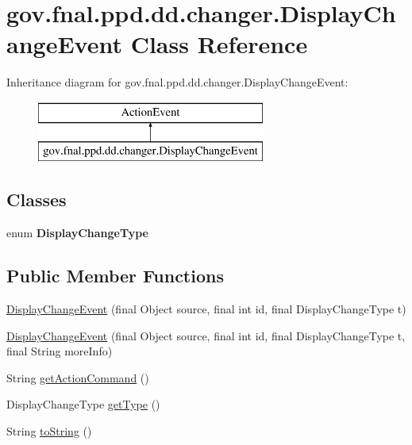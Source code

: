 \hypertarget{classgov_1_1fnal_1_1ppd_1_1dd_1_1changer_1_1DisplayChangeEvent}{\section{gov.\-fnal.\-ppd.\-dd.\-changer.\-Display\-Change\-Event Class Reference}
\label{classgov_1_1fnal_1_1ppd_1_1dd_1_1changer_1_1DisplayChangeEvent}
}
Inheritance diagram for gov.\-fnal.\-ppd.\-dd.\-changer.\-Display\-Change\-Event\-:\begin{figure}[H]
\begin{center}
\leavevmode
\includegraphics[height=2.000000cm]{classgov_1_1fnal_1_1ppd_1_1dd_1_1changer_1_1DisplayChangeEvent}
\end{center}
\end{figure}
\subsection*{Classes}
\begin{DoxyCompactItemize}
\item 
enum {\bfseries Display\-Change\-Type}
\end{DoxyCompactItemize}
\subsection*{Public Member Functions}
\begin{DoxyCompactItemize}
\item 
\hyperlink{classgov_1_1fnal_1_1ppd_1_1dd_1_1changer_1_1DisplayChangeEvent_ae735354f3acc872548ef7e8e2f800850}{Display\-Change\-Event} (final Object source, final int id, final Display\-Change\-Type t)
\item 
\hyperlink{classgov_1_1fnal_1_1ppd_1_1dd_1_1changer_1_1DisplayChangeEvent_a6de1a5ba1faba95ab69da6d7edb35f45}{Display\-Change\-Event} (final Object source, final int id, final Display\-Change\-Type t, final String more\-Info)
\item 
String \hyperlink{classgov_1_1fnal_1_1ppd_1_1dd_1_1changer_1_1DisplayChangeEvent_aa9d6c32dc6c463df4bfff0456cbb5ee3}{get\-Action\-Command} ()
\item 
Display\-Change\-Type \hyperlink{classgov_1_1fnal_1_1ppd_1_1dd_1_1changer_1_1DisplayChangeEvent_abc82205f78d3bfa456680101a54816fb}{get\-Type} ()
\item 
String \hyperlink{classgov_1_1fnal_1_1ppd_1_1dd_1_1changer_1_1DisplayChangeEvent_ae368d2c34216aa7b39d4c359912a5bcf}{to\-String} ()
\end{DoxyCompactItemize}


